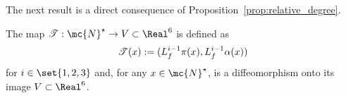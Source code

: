 The next result is a direct consequence of Proposition~\ref{prop:relative_degree}.
\begin{corollary}\label{cor:diffeo}
 The map $\mathscr{T}: \mc{N}^\star \rightarrow V \subset \Real^6 $ is defined as
  \begin{equation}
  \label{eq:diffeo}
        \mathscr{T}(x) := (L^{i-1}_f\pi(x),L^{i-1}_f\alpha(x))
  \end{equation}
%  
for $i\in\set{1,2,3}$ and, for any $\mynne{x} \in \mc{N}^\star $,
is a diffeomorphism onto its image $V\subset \Real^6$.
\end{corollary}
